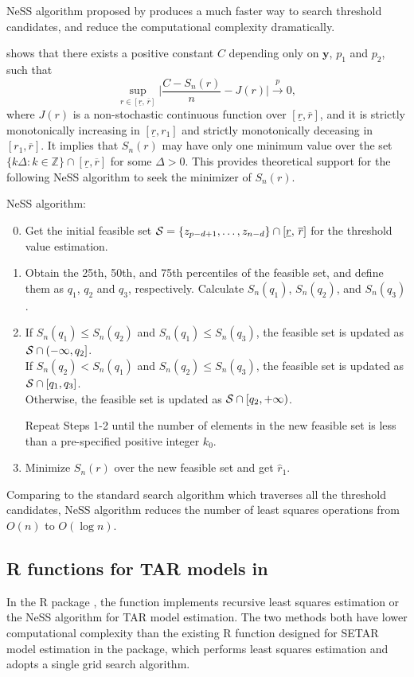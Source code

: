  NeSS algorithm proposed by \cite{li2016} produces a much faster way to search threshold candidates, and reduce the computational complexity dramatically.

\cite{li2016} shows that there exists a positive constant $C$ depending only on ${\mathbf y}$, $p_1$ and $p_2$, such that
\[
\sup_{r \in [ \underline{r}, \, \overline{r}]} \Big | \frac{C-S_n(r)}{n}-J(r) \Big| \overset{p}{\to} 0,
\]
where $J(r)$ is a non-stochastic continuous function over $[\underline{r}, \overline{r}]$, and it is strictly monotonically increasing in $[\underline{r}, r_1]$ and strictly monotonically deceasing in $[r_1, \overline{r}]$. It implies that $S_n(r)$ may have only one minimum value over the set $\{k\Delta: k\in {\mathbb{Z}}\} \cap [\underline{r}, \overline{r}]$ for some $\Delta>0$. This provides theoretical support for the following NeSS algorithm to seek the minimizer of $S_n(r)$.

NeSS algorithm:
\begin{enumerate}
\setcounter{enumi}{-1}
\item Get the initial feasible set ${\cal S}=\{{z}_{p-d+1},\ldots,{z}_{n-d}\}\cap [\underline{r},\, \overline{r}]$ for the threshold value estimation.

\item Obtain the 25th, 50th, and 75th percentiles of the feasible set, and define them as $q_1$, $q_2$ and $q_3$, respectively. Calculate $S_n(q_1)$, $S_n(q_2)$, and $S_n(q_3)$. 
\item If $S_n(q_1)\leq S_n(q_2)$ and $S_n(q_1)\leq S_n(q_3)$, the feasible set is updated as ${\cal S} \cap (-\infty,q_2]$.\\ If $S_n(q_2)< S_n(q_1)$ and $S_n(q_2)\leq S_n(q_3)$, the feasible set is updated as ${\cal S} \cap [q_1,q_3]$. \\
Otherwise, the feasible set is updated as ${\cal S} \cap [q_2, +\infty)$.  

Repeat Steps 1-2 until the number of elements in the new feasible set is less than a pre-specified positive integer $k_0$.
\item Minimize $S_n(r)$ over the new feasible set and get $\hat{r}_1$.
\end{enumerate}

Comparing to the standard search algorithm which traverses all the threshold candidates, NeSS algorithm reduces the number of least squares operations from $O(n)$ to $O(\log n)$.

\subsection{R functions for TAR models in }
In the R package , the function  implements recursive least squares estimation or the NeSS algorithm for TAR model estimation. The two methods both have lower computational complexity than the existing {R} function  designed for SETAR model estimation in
the {} package, which performs least squares estimation
and adopts a single grid search algorithm. 

